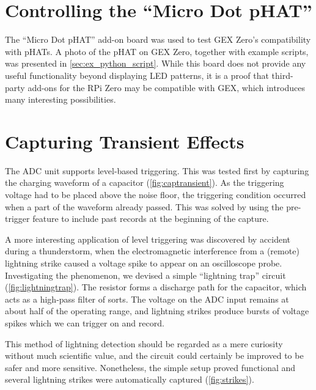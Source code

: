 \section{Controlling the ``Micro Dot pHAT''}

The ``Micro Dot pHAT'' add-on board was used to test GEX Zero's compatibility with pHATs. A photo of the pHAT on GEX Zero, together with example scripts, was presented in \cref{sec:ex_python_script}. While this board does not provide any useful functionality beyond displaying \gls{LED} patterns, it is a proof that third-party add-ons for the RPi Zero may be compatible with GEX, which introduces many interesting possibilities.

\section{Capturing Transient Effects}

The ADC unit supports level-based triggering. This was tested first by capturing the charging waveform of a capacitor (\cref{fig:captransient}). As the triggering voltage had to be placed above the noise floor, the triggering condition occurred when a part of the waveform already passed. This was solved by using the pre-trigger feature to include past records at the beginning of the capture.

A more interesting application of level triggering was discovered by accident during a thunderstorm, when the electromagnetic interference from a (remote) lightning strike caused a voltage spike to appear on an oscilloscope probe. Investigating the phenomenon, we devised a simple ``lightning trap'' circuit (\cref{fig:lightningtrap}). The resistor forms a discharge path for the capacitor, which acts as a high-pass filter of sorts. The voltage on the \gls{ADC} input remains at about half of the operating range, and lightning strikes produce bursts of voltage spikes which we can trigger on and record.

This method of lightning detection should be regarded as a mere curiosity without much scientific value, and the circuit could certainly be improved to be safer and more sensitive. Nonetheless, the simple setup proved functional and several lightning strikes were automatically captured (\cref{fig:strikes}). 

